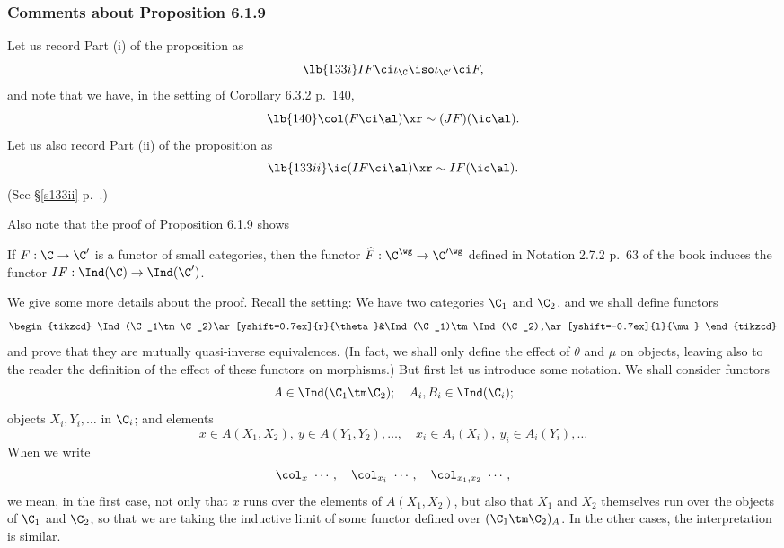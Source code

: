 \documentclass[12pt]{article}
\theoremstyle{remark}
\theoremstyle{definition}
\begin{document}
\subsubsection{Comments about Proposition 6.1.9} 

Let us record Part (i) of the proposition as 
\begin{equation}\lb{133i}
IF\ci\iota_\C\iso\iota_{\C'}\ci F, 
\end{equation} 
and note that we have, in the setting of Corollary 6.3.2 p.~140, 
\begin{equation}\lb{140}
\col(F\ci\al)\xr\sim(JF)(\ic\al).
\end{equation} 
Let us also record Part (ii) of the proposition as 
\begin{equation}\lb{133ii}
\ic(IF\ci\al)\xr\sim IF(\ic\al).
\end{equation} 
(See \S\ref{s133ii} p.~.)

Also note that the proof of Proposition 6.1.9 shows

\begin{prop}
If $F:\C\to\C'$ is a functor of small categories, then the functor $\widehat F:\C^\wg\to\C'^\wg$ defined in Notation 2.7.2 p.~63 of the book induces the functor $IF:\Ind(\C)\to\Ind(\C')$.
\end{prop}



We give some more details about the proof. Recall the setting: We have two categories $\C_1$ and $\C_2$, and we shall define functors
$$
\begin{tikzcd}
\Ind(\C_1\tm\C_2)\ar[yshift=0.7ex]{r}{\theta}&\Ind(\C_1)\tm\Ind(\C_2),\ar[yshift=-0.7ex]{l}{\mu}
\end{tikzcd}
$$ 
and prove that they are mutually quasi-inverse equivalences. (In fact, we shall only define the effect of $\theta$ and $\mu$ on objects, leaving also to the reader the definition of the effect of these functors on morphisms.) But first let us introduce some notation. We shall consider functors 
$$
A\in\Ind(\C_1\tm\C_2);\quad A_i,B_i\in\Ind(\C_i);
$$ 
objects $X_i,Y_i,\dots$ in $\C_i$; and elements 
$$
x\in A(X_1,X_2),\ y\in A(Y_1,Y_2),\dots,\quad x_i\in A_i(X_i),\ y_i\in A_i(Y_i),\dots
$$ 
When we write 
$$
\col_x\ \cdots,\quad\col_{x_i}\ \cdots,\quad\col_{x_1,x_2}\ \cdots,
$$ 
we mean, in the first case, not only that $x$ runs over the elements of $A(X_1,X_2)$, but also that $X_1$ and $X_2$ themselves run over the objects of $\C_1$ and $\C_2$, so that we are taking the inductive limit of some functor defined over $(\C_1\tm\C_2)_A$. In the other cases, the interpretation is similar. 
\end{document}

